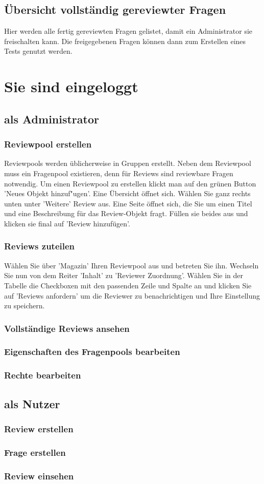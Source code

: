 \documentclass[12pt,a4paper]{scrreprt}
\begin{document}
\section{Übersicht vollständig gereviewter Fragen}
Hier werden alle fertig gereviewten Fragen gelistet, damit ein Administrator sie freischalten kann. Die freigegebenen Fragen können dann zum Erstellen eines Tests genutzt werden.


\chapter{Sie sind eingeloggt}
	\section{als Administrator}
		\subsection{Reviewpool erstellen}
		Reviewpools werden üblicherweise in Gruppen erstellt. Neben dem Reviewpool muss ein Fragenpool existieren, denn für Reviews sind reviewbare Fragen notwendig. Um einen Reviewpool zu erstellen klickt man auf den grünen Button 'Neues Objekt hinzuf"ugen'. Eine Übersicht öffnet sich. Wählen Sie ganz rechts unten unter 'Weitere' Review aus. Eine Seite öffnet sich, die Sie um einen Titel und eine Beschreibung für das Review-Objekt fragt. Füllen sie beides aus und klicken sie final auf 'Review hinzufügen'.
		\subsection{Reviews zuteilen}
		Wählen Sie über 'Magazin' Ihren Reviewpool aus und betreten Sie ihn. Wechseln Sie nun von dem Reiter 'Inhalt' zu 'Reviewer Zuordnung'. Wählen Sie in der Tabelle die Checkboxen mit den passenden Zeile und Spalte an und klicken Sie auf 'Reviews anfordern' um die Reviewer zu benachrichtigen und Ihre Einstellung zu speichern.
		\subsection{Vollständige Reviews ansehen}
		
		\subsection{Eigenschaften des Fragenpools bearbeiten}
		\subsection{Rechte bearbeiten}
	\section{als Nutzer}
		\subsection{Review erstellen}
		\subsection{Frage erstellen}
		\subsection{Review einsehen}
\end{document}

